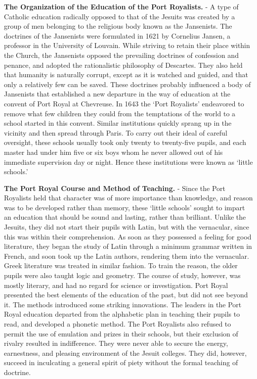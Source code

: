 \documentclass[
]{book}
\begin{document}
\textbf{The Organization of the Education of the Port Royalists.} - A type of Catholic education radically opposed to that of the Jesuits was created by a group of men belonging to the religious body known as the Jansenists. The doctrines of the Jansenists were formulated in 1621 by Cornelius Jansen, a professor in the University of Louvain. While striving to retain their place within the Church, the Jansenists opposed the prevailing doctrines of confession and penance, and adopted the rationalistic philosophy of Descartes. They also held that humanity is naturally corrupt, except as it is watched and guided, and that only a relatively few can be saved. These doctrines probably influenced a body of Jansenists that established a new departure in the way of education at the convent of Port Royal at Chevreuse. In 1643 the `Port Royalists' endeavored to remove what few children they could from the temptations of the world to a school started in this convent. Similar institutions quickly sprang up in the vicinity and then spread through Paris. To carry out their ideal of careful oversight, these schools usually took only twenty to twenty-five pupils, and each master had under him five or six boys whom he never allowed out of his immediate supervision day or night. Hence these institutions were known as `little schools.'

\textbf{The Port Royal Course and Method of Teaching.} - Since the Port Royalists held that character was of more importance than knowledge, and reason was to be developed rather than memory, these `little schools' sought to impart an education that should be sound and lasting, rather than brilliant. Unlike the Jesuits, they did not start their pupils with Latin, but with the vernacular, since this was within their comprehension. As soon as they possessed a feeling for good literature, they began the study of Latin through a minimum grammar written in French, and soon took up the Latin authors, rendering them into the vernacular. Greek literature was treated in similar fashion. To train the reason, the older pupils were also taught logic and geometry. The course of study, however, was mostly literary, and had no regard for science or investigation. Port Royal presented the best elements of the education of the past, but did not see beyond it. The methods introduced some striking innovations. The leaders in the Port Royal education departed from the alphabetic plan in teaching their pupils to read, and developed a phonetic method. The Port Royalists also refused to permit the use of emulation and prizes in their schools, but their exclusion of rivalry resulted in indifference. They were never able to secure the energy, earnestness, and pleasing environment of the Jesuit colleges. They did, however, succeed in inculcating a general spirit of piety without the formal teaching of doctrine.
\end{document}
